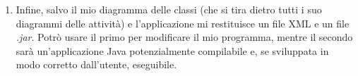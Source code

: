\begin{enumerate}
	\item Infine, salvo il mio diagramma delle classi (che si tira dietro tutti i suo diagrammi delle attività) e l'applicazione mi restituisce un file XML e un file \emph{.jar}. Potrò usare il primo per modificare il mio programma, mentre il secondo sarà un'applicazione Java potenzialmente compilabile e, se sviluppata in modo corretto dall'utente, eseguibile.
\end{enumerate}



